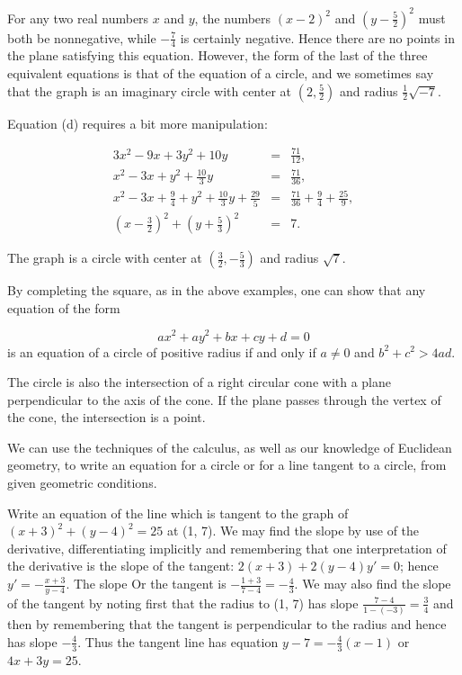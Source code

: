 \begin{example}
For any two real numbers $x$ and $y$, the numbers $(x-2)^2$ and $(y-\frac{5}{2})^2$ must both be nonnegative, while $-\frac{7}{4}$ is certainly negative. Hence there are no points in the plane satisfying this equation. However, the form of the last of the three equivalent equations is that of the equation of a circle, and we sometimes say that the graph is an imaginary circle with center at $(2, \frac{5}{2})$ and radius $\frac{1}{2}\sqrt{-7}$.

Equation (d) requires a bit more manipulation:

\begin{eqnarray*}
                                                  3x^2 - 9x + 3y^2 + 10y &=& \frac{71}{12},\\
                                         x^2 - 3x + y^2 + \frac{10}{3}y &=& \frac{71}{36},\\
x^2 - 3x + \frac{9}{4} + y^2 + \frac{10}{3}y + \frac{29}{5} &=& \frac{71}{36} + \frac{9}{4} + \frac{25}{9}, \\
                             (x - \frac{3}{2})^2 + (y + \frac{5}{3})^2 &=& 7.
\end{eqnarray*}

\noindent The graph is a circle with center at $(\frac{3}{2}, -\frac{5}{3})$ and radius $\sqrt7$.
\end{example}
\medskip

By completing the square, as in the above examples, one can show that any equation of the form

$$
ax^2 + ay^2 + bx + cy + d = 0
$$
\noindent is an equation of a circle of positive radius if and only if $a \neq 0$ and $b^2 + c^2 > 4ad$.

The circle is also the intersection of a right circular cone with a plane perpendicular to the axis of the cone. If the plane passes through the vertex of the cone, the intersection is a point.

We can use the techniques of the calculus, as well as our knowledge of Euclidean geometry, to write an equation for a circle or for a line tangent to a circle, from given geometric conditions.

\begin{example}
Write an equation of the line which is tangent to the graph of $(x + 3)^2 + (y - 4)^2
= 25$ at (1, 7). We may find the slope by use of the derivative, differentiating implicitly and remembering that one interpretation of the derivative is the slope of the tangent: $2(x + 3) + 2(y - 4)y' = 0$; hence $y' = - \frac{x + 3}{y - 4}$. The slope Or the tangent is $-\frac{1 + 3}{7 - 4} = - \frac{4}{3}$. We
may also find the slope of the tangent by noting first that the radius to (1, 7) has slope $\frac{7-4}{1- (-3)}= \frac{3}{4}$ and then by remembering that the tangent is perpendicular to the radius and hence has slope $-\frac{4}{3}$. Thus the tangent line has equation $y-7 = - \frac{4}{3}(x-1)$ or $4x + 3y = 25$.
\end{example}


